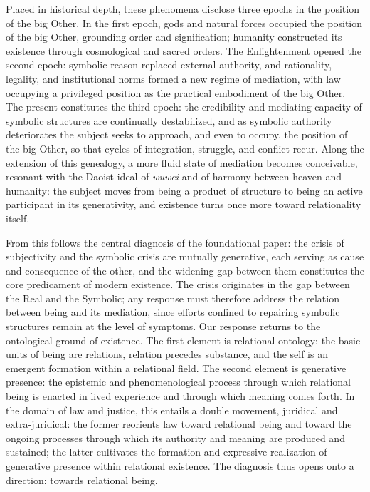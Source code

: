 \documentclass[11pt]{book}
\begin{document}
Placed in historical depth, these phenomena disclose three epochs in the position of the big Other. In the first epoch, gods and natural forces occupied the position of the big Other, grounding order and signification; humanity constructed its existence through cosmological and sacred orders. The Enlightenment opened the second epoch: symbolic reason replaced external authority, and rationality, legality, and institutional norms formed a new regime of mediation, with law occupying a privileged position as the practical embodiment of the big Other. The present constitutes the third epoch: the credibility and mediating capacity of symbolic structures are continually destabilized, and as symbolic authority deteriorates the subject seeks to approach, and even to occupy, the position of the big Other, so that cycles of integration, struggle, and conflict recur. Along the extension of this genealogy, a more fluid state of mediation becomes conceivable, resonant with the Daoist ideal of \emph{wuwei} and of harmony between heaven and humanity: the subject moves from being a product of structure to being an active participant in its generativity, and existence turns once more toward relationality itself.

From this follows the central diagnosis of the foundational paper: the crisis of subjectivity and the symbolic crisis are mutually generative, each serving as cause and consequence of the other, and the widening gap between them constitutes the core predicament of modern existence. The crisis originates in the gap between the Real and the Symbolic; any response must therefore address the relation between being and its mediation, since efforts confined to repairing symbolic structures remain at the level of symptoms. Our response returns to the ontological ground of existence. The first element is relational ontology: the basic units of being are relations, relation precedes substance, and the self is an emergent formation within a relational field. The second element is generative presence: the epistemic and phenomenological process through which relational being is enacted in lived experience and through which meaning comes forth. In the domain of law and justice, this entails a double movement, juridical and extra-juridical: the former reorients law toward relational being and toward the ongoing processes through which its authority and meaning are produced and sustained; the latter cultivates the formation and expressive realization of generative presence within relational existence. The diagnosis thus opens onto a direction: towards relational being.
\end{document}

